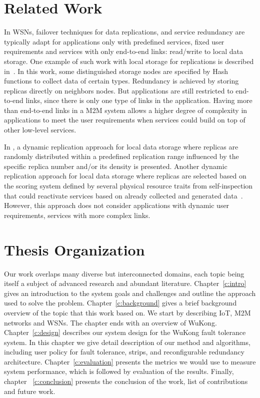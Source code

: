 \section{Related Work}

In WSNs, failover techniques for data replications, and service redundancy are
typically adapt for applications only with predefined services, fixed user
requirements and services with only end-to-end links: read/write to local data
storage. One example of such work with local storage for replications is
described in~\cite{Ratnasamy2002}. In this work, some distinguished storage
nodes are specified by Hash functions to collect data of certain types.
Redundancy is achieved by storing replicas directly on neighbors nodes. But
applications are still restricted to end-to-end links, since there is only one
type of links in the application.
Having more than end-to-end links in a M2M system allows a higher degree of
complexity in applications to meet the user requirements when services could
build on top of other low-level services.

In \cite{Piotrowski2009}, a dynamic replication approach for local data storage
where replicas are randomly distributed within a predefined replication range
influenced by the specific replica number and/or its density is presented. 
Another dynamic replication approach for local data storage where replicas are
selected based on the scoring system defined by several physical resource traits
from self-inspection that could reactivate services based on already collected
and generated data~\cite{Neumann2010}. However, this approach does not consider
applications with dynamic user requirements, services with more complex links.

\section{Thesis Organization}

Our work overlaps many diverse but interconnected domains, each topic being
itself a subject of advanced research and abundant literature.
Chapter~\ref{c:intro} gives an introduction to the system goals and challenges
and outline the approach used to solve the problem. Chapter~\ref{c:background}
gives a brief background overview of the topic that this work based on.  We
start by describing IoT, M2M networks and WSNs. The chapter ends with an
overview of WuKong. Chapter~\ref{c:design} describes our system design for the
WuKong fault tolerance system. In this chapter we give detail description of our
method and algorithms, including user policy for fault tolerance, strips, and
reconfigurable redundancy architecture.  Chapter~\ref{c:evaluation} presents the
metrics we would use to measure system performance, which is followed by
evaluation of the results. Finally, chapter ~\ref{c:conclusion} presents the
conclusion of the work, list of contributions and future work.
